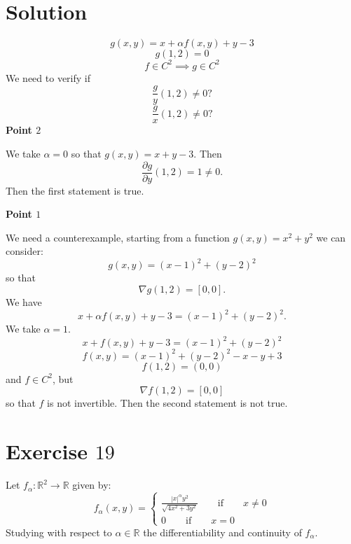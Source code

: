 \documentclass[a4paper, twoside, openany]{book}
\begin{document}
\section*{Solution}
$$g(x, y) = x + \alpha f(x, y) + y - 3$$
$$g(1, 2) = 0$$
$$f \in C^2 \implies g \in C^2$$
We need to verify if
$$\frac{g}{y} (1, 2) \neq 0 ?$$
$$\frac{g}{x} (1, 2) \neq 0 ?$$
\textbf{Point $2$} \par 
We take $\alpha = 0$ so that $g(x, y) = x + y - 3$. Then
$$\frac{\partial g}{\partial y}(1, 2) = 1 \neq 0.$$
Then the first statement is true. \par
\textbf{Point $1$} \par  
We need a counterexample, starting from a function $g(x, y) = x^2 + y^2$ we can consider:
$$g(x, y) = (x - 1)^2 + (y - 2)^2$$
so that
$$\nabla g(1, 2) = [0, 0].$$
We have
$$x + \alpha f(x, y) + y - 3 = (x - 1)^2 + (y - 2)^2.$$
We take $\alpha = 1$.
$$x + f(x, y) + y - 3 = (x - 1)^2 + (y - 2)^2$$
$$f(x, y) = (x - 1)^2 + (y - 2)^2 - x - y + 3$$
$$f(1, 2) = (0, 0)$$
and $f \in C^2$, but
$$\nabla f(1, 2) = [0, 0]$$
so that $f$ is not invertible. Then the second statement is not true.
\clearpage
\section*{Exercise $19$}
Let $f_{\alpha} : \mathbb{R}^2 \rightarrow \mathbb{R}$ given by:
$$f_{\alpha}(x, y) = \begin{cases}
						\frac{|x|^{\alpha} y^2}{\sqrt{4 x^2 + 3 y^2}} \qquad \textrm{if} \qquad x \neq 0 \\
						0 \qquad \textrm{if} \qquad x = 0
					 \end{cases}$$
Studying with respect to $\alpha \in \mathbb{R}$ the differentiability and continuity of $f_{\alpha}$.
\end{document}
